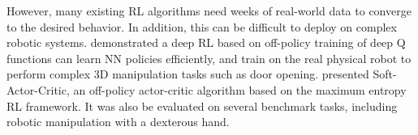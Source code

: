 However, many existing RL algorithms need weeks of real-world data to converge to the desired behavior. In addition, this can be difficult to deploy on complex robotic systems. \citep{reinforcementl} demonstrated a deep RL based on off-policy training of deep Q functions can learn NN policies efficiently, and train on the real physical robot to perform complex 3D manipulation tasks such as door opening. \citep{drlsac} presented Soft-Actor-Critic, an off-policy actor-critic algorithm based on the maximum entropy RL framework. It was also be evaluated on several benchmark tasks, including robotic manipulation with a dexterous hand.


